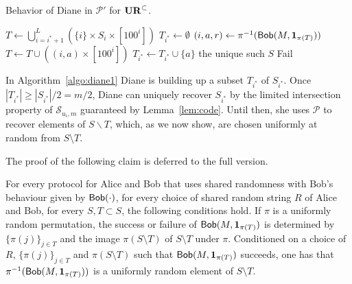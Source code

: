 \begin{algorithm}[H] 
  \caption{Behavior of Diane in $\mathcal P'$ for $\mathbf{UR}^\subset$.} \label{algo:diane1}
  \begin{algorithmic}[1]
    \State $T \leftarrow \bigcup_{i=i^*+1}^L (\{i\} \times S_i \times [100^i])$
    \State $T_{i^*}\leftarrow \emptyset$
      \State $(i,a,r)\leftarrow \pi^{-1}(\mathsf{Bob}(M, \mathbf{1}_{\pi(T)}))$
      \State $T\leftarrow T \cup ((i,a) \times [100^i])$
        \State $T_{i^*} \leftarrow T_{i^*}\cup \{a\}$
      \EndIf
    \EndWhile
      \State \Return the unique such $S$
    \Else
      \State \Return \textsf{Fail}
    \EndIf
    \EndProcedure
  \end{algorithmic}
\end{algorithm}

In Algorithm~\ref{algo:diane1} Diane is building up a subset $T_{i^*}$ of $S_{i^*}$. Once $|T_{i^*}| \ge |S_{i^*}|/2 = m/2$, Diane can uniquely recover $S_{i^*}$ by the limited intersection property of $\mathcal{S}_{u_i,m}$ guaranteed by Lemma~\ref{lem:code}. Until then, she uses $\mathcal P$ to recover elements of $S\backslash T$, which, as we now show, are chosen uniformly at random from $S\setminus T$. 

The  proof of the following claim is deferred to the full version.
\begin{claim}\label{cl:uniform}
For every protocol for Alice and Bob that uses shared randomness with Bob's behaviour given by $\mathsf{Bob}(\cdot)$, for every choice of shared random string $R$ of Alice and Bob, for every $S, T\subset S$, the following conditions hold. If $\pi$ is a uniformly random permutation, the success or failure of $\mathsf{Bob}(M, \mathbf{1}_{\pi(T)})$ is determined by $\{\pi(j)\}_{j\in T}$ and the image $\pi(S\setminus T)$ of $S\setminus T$ under $\pi$. Conditioned on a choice of $R$, $\{\pi(j)\}_{j\in T}$ and $\pi(S\setminus T)$ such that $\mathsf{Bob}(M, \mathbf{1}_{\pi(T)})$ succeeds, one has that $\pi^{-1}(\mathsf{Bob}(M, \mathbf{1}_{\pi(T)}))$ is a uniformly random element of $S\setminus T$.
\end{claim}

